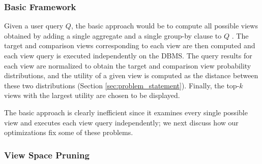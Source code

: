 \subsubsection{Basic Framework}
\label{subsubsec:basic_framework}

Given a user query $Q$, the basic approach would be to compute all
possible views obtained by adding a single aggregate and a single group-by
clause to $Q$ . 
The target and comparison views corresponding to each view are then
computed and each view query is executed independently on the DBMS. The query
results for each view are normalized to obtain the target and comparison view
probability distributions, and the utility of a given view is computed as the
distance between these two distributions (Section \ref{sec:problem_statement}).
Finally, the top-$k$ views with the largest utility are chosen to be displayed. 

The basic approach is clearly inefficient
since it examines every single possible view 
and executes each view query independently;
we next discuss how our optimizations fix some of these problems.

\subsubsection{View Space Pruning}
\label{subsubsec:view_space_pruning}

